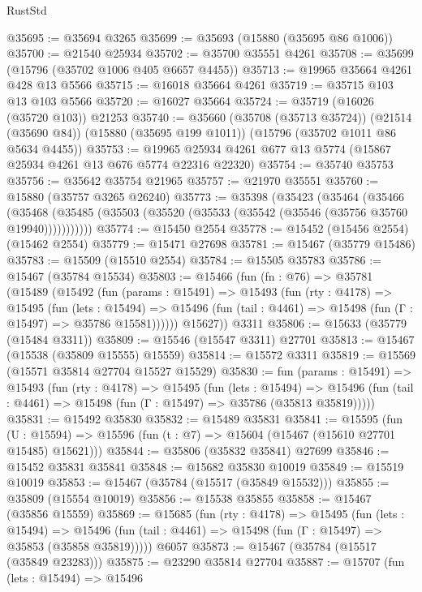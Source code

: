 \begin{lexlean}{RustStd}
\begin{coremodule}
@35695 := @35694 @3265
@35699 := @35693 (@15880 (@35695 @86 @1006))
@35700 := @21540 @25934
@35702 := @35700 @35551 @4261
@35708 := @35699 (@15796 (@35702 @1006 @405 @6657 @4455))
@35713 := @19965 @35664 @4261 @428 @13 @5566
@35715 := @16018 @35664 @4261
@35719 := @35715 @103 @13 @103 @5566
@35720 := @16027 @35664
@35724 := @35719 (@16026 (@35720 @103)) @21253
@35740 := @35660
    (@35708 (@35713 @35724))
    (@21514 (@35690 @84))
    (@15880 (@35695 @199 @1011))
    (@15796 (@35702 @1011 @86 @5634 @4455))
@35753 := @19965 @25934 @4261 @677 @13 @5774 (@15867 @25934 @4261 @13 @676 @5774 @22316 @22320)
@35754 := @35740 @35753
@35756 := @35642 @35754 @21965
@35757 := @21970 @35551
@35760 := @15880 (@35757 @3265 @26240)
@35773 := @35398
    (@35423
      (@35464
        (@35466
          (@35468 (@35485 (@35503 (@35520 (@35533 (@35542 (@35546 (@35756 @35760 @19940)))))))))))
@35774 := @15450 @2554
@35778 := @15452 (@15456 @2554) (@15462 @2554)
@35779 := @15471 @27698
@35781 := @15467 (@35779 @15486)
@35783 := @15509 (@15510 @2554)
@35784 := @15505 @35783
@35786 := @15467 (@35784 @15534)
@35803 := @15466
    (fun (fn : @76) =>
    @35781
      (@15489
        (@15492
          (fun (params : @15491) =>
          @15493
            (fun (rty : @4178) =>
            @15495
              (fun (lets : @15494) =>
              @15496 (fun (tail : @4461) => @15498 (fun (Γ : @15497) => @35786 @15581))))))
        @15627))
    @3311
@35806 := @15633 (@35779 (@15484 @3311))
@35809 := @15546 (@15547 @3311) @27701
@35813 := @15467 (@15538 (@35809 @15555) @15559)
@35814 := @15572 @3311
@35819 := @15569 (@15571 @35814 @27704 @15527 @15529)
@35830 := fun (params : @15491) =>
  @15493
    (fun (rty : @4178) =>
    @15495
      (fun (lets : @15494) =>
      @15496 (fun (tail : @4461) => @15498 (fun (Γ : @15497) => @35786 (@35813 @35819)))))
@35831 := @15492 @35830
@35832 := @15489 @35831
@35841 := @15595
    (fun (U : @15594) => @15596 (fun (t : @7) => @15604 (@15467 (@15610 @27701 @15485) @15621)))
@35844 := @35806 (@35832 @35841) @27699
@35846 := @15452 @35831 @35841
@35848 := @15682 @35830 @10019
@35849 := @15519 @10019
@35853 := @15467 (@35784 (@15517 (@35849 @15532)))
@35855 := @35809 (@15554 @10019)
@35856 := @15538 @35855
@35858 := @15467 (@35856 @15559)
@35869 := @15685
    (fun (rty : @4178) =>
    @15495
      (fun (lets : @15494) =>
      @15496 (fun (tail : @4461) => @15498 (fun (Γ : @15497) => @35853 (@35858 @35819)))))
    @6057
@35873 := @15467 (@35784 (@15517 (@35849 @23283)))
@35875 := @23290 @35814 @27704
@35887 := @15707
    (fun (lets : @15494) =>
    @15496

\end{coremodule}
\end{lexlean}
